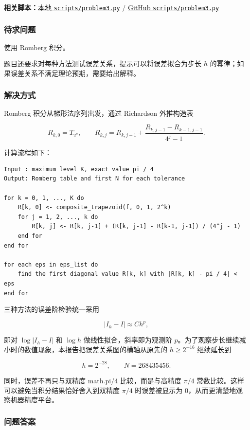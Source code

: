 \documentclass[12pt,a4paper,fontset=none]{ctexart}
\renewcommand{\texttt}[1]{{\ttfamily\footnotesize #1}}
\renewcommand{\texttt}[1]{{\ttfamily #1}}%
\newcommand{\fileinline}[1]{{\urlstyle{same}\nolinkurl{#1}}}
\newcommand{\metadataline}[1]{#1}
\newcommand{\scriptpath}[1]{\fileinline{#1}}
\newcommand{\githubscriptsbase}{https://github.com/Void0312Aurora/computational-physics-homework-2026/blob/main/07/scripts}
\newcommand{\scriptlink}[1]{\noindent\metadataline{\textbf{相关脚本：}\href{../../../scripts/#1}{本地 \scriptpath{scripts/#1}} / \href{\githubscriptsbase/#1}{GitHub \scriptpath{scripts/#1}}}\par\medskip}
\begin{document}
\scriptlink{problem3.py}

\subsubsection{待求问题}\label{ux5f85ux6c42ux95eeux9898-6}

使用 Romberg 积分。

题目还要求对每种方法测试误差关系，提示可以将误差拟合为步长 \(h\) 的幂律；如果误差关系不满足理论预期，需要给出解释。

\subsubsection{解决方式}\label{ux89e3ux51b3ux65b9ux5f0f-6}

Romberg 积分从梯形法序列出发，通过 Richardson 外推构造表

\[
R_{k,0}=T_{2^k},
\qquad
R_{k,j}=R_{k,j-1}+
\frac{R_{k,j-1}-R_{k-1,j-1}}{4^j-1}.
\]

计算流程如下：

\begin{verbatim}
Input : maximum level K, exact value pi / 4
Output: Romberg table and first N for each tolerance

for k = 0, 1, ..., K do
    R[k, 0] <- composite_trapezoid(f, 0, 1, 2^k)
    for j = 1, 2, ..., k do
        R[k, j] <- R[k, j-1] + (R[k, j-1] - R[k-1, j-1]) / (4^j - 1)
    end for
end for

for each eps in eps_list do
    find the first diagonal value R[k, k] with |R[k, k] - pi / 4| < eps
end for
\end{verbatim}

三种方法的误差阶检验统一采用

\[
|I_h-I|\approx Ch^p,
\]

即对 \(\log |I_h-I|\) 和 \(\log h\) 做线性拟合，斜率即为观测阶 \(p\)。为了观察步长继续减小时的数值现象，本报告把误差关系图的横轴从原先的 \(h\ge 2^{-16}\) 继续延长到

\[
h=2^{-28},\qquad N=268435456.
\]

同时，误差不再只与双精度 \texttt{math.pi/4} 比较，而是与高精度 \(\pi/4\) 常数比较。这样可以避免当积分结果恰好舍入到双精度 \(\pi/4\) 时误差被显示为 \(0\)，从而更清楚地观察机器精度平台。

\subsubsection{问题答案}\label{ux95eeux9898ux7b54ux6848-6}
\end{document}
